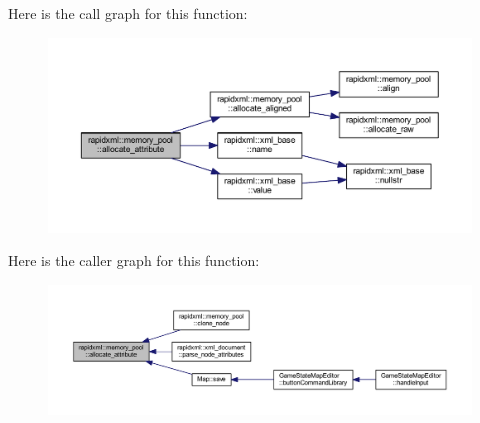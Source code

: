 Here is the call graph for this function\+:
\nopagebreak
\begin{figure}[H]
\begin{center}
\leavevmode
\includegraphics[width=350pt]{classrapidxml_1_1memory__pool_a3de2a66c983336e006ea3844e244ed30_cgraph}
\end{center}
\end{figure}




Here is the caller graph for this function\+:
\nopagebreak
\begin{figure}[H]
\begin{center}
\leavevmode
\includegraphics[width=350pt]{classrapidxml_1_1memory__pool_a3de2a66c983336e006ea3844e244ed30_icgraph}
\end{center}
\end{figure}


